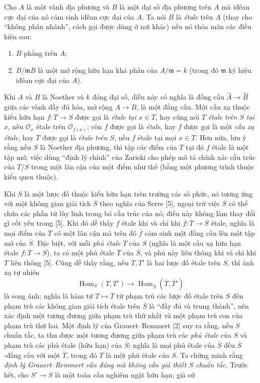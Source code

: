 Cho $A$ là một vành địa phương và $B$ là một đại số địa phương trên $A$ mà
iđêan cực đại của nó cảm sinh iđêan cực đại của $A$. Ta nói $B$ là
\emph{étale} trên $A$ (thay cho ``không phân nhánh'', cách gọi được dùng ở nơi
khác) nếu nó thỏa mãn các điều kiện sau:
\begin{enumerate}
\item[(i)] $B$ phẳng trên $A$;
\item[(ii)] $B/\mathfrak mB$ là một mở rộng hữu hạn khả phân của
$A/\mathfrak m=k$ (trong đó $\mathfrak m$ ký hiệu iđêan cực đại của $A$).
\end{enumerate}
Khi $A$ và $B$ là Noether và $k$ đóng đại số, điều này có nghĩa là đồng cấu
$\widehat A\longrightarrow\widehat B$ giữa các vành đầy đủ hóa, mở rộng
$A\longrightarrow B$, là một đẳng cấu. Một cấu xạ thuộc kiểu hữu hạn
$f:T\longrightarrow S$ được gọi là \emph{étale tại $x\in T$}, hay cũng nói
$T$ \emph{étale trên $S$ tại $x$}, nếu $\mathcal O_x$ étale trên
$\mathcal O_{f(x)}$; còn $f$ được gọi là \emph{étale}, hay $f$ được gọi là một
\emph{cấu xạ étale}, hay $T$ được gọi là \emph{étale trên $S$}, nếu $f$ étale tại mọi
$x\in T$. Hơn nữa, lưu ý rằng nếu $S$ là Noether địa phương, thì tập các điểm của
$T$ tại đó $f$ étale là một tập mở; việc dùng ``định lý chính'' của Zariski cho
phép mô tả chính xác cấu trúc của $T/S$ trong một lân cận của một điểm như thế
(bằng một phương trình thuộc kiểu quen thuộc).

Khi $S$ là một lược đồ thuộc kiểu hữu hạn trên trường các số phức, nó tương ứng
với một không gian giải tích $\overline S$ theo nghĩa của Serre [5], ngoại trừ
việc $\overline S$ có thể chứa các phần tử lũy linh trong bó cấu trúc của nó;
điều này không làm thay đổi gì cốt yếu trong [5]. Khi đó dễ thấy $f$ étale khi
và chỉ khi $\overline f:\overline T\longrightarrow\overline S$ étale, nghĩa là
mọi điểm của $\overline T$ có một lân cận mà trên đó $\overline f$ cảm sinh một
đẳng cấu lên một tập mở của $\overline S$. Đặc biệt, với mỗi \emph{phủ étale}
$T$ của $S$ (nghĩa là một cấu xạ hữu hạn étale $f:T\longrightarrow S$), ta có
một phủ étale $\overline T$ của $\overline S$, và phủ này liên thông khi và chỉ
khi $T$ liên thông [5]. Cũng dễ thấy rằng, nếu $T,T'$ là hai lược đồ
étale trên $S$, thì ánh xạ tự nhiên
\[
  \operatorname{Hom}_S(T,T')\longrightarrow
  \operatorname{Hom}_{\overline S}(\overline T,\overline{T'})
\]
là song ánh; nghĩa là hàm tử $T\longmapsto\overline T$ từ phạm trù các lược đồ
étale trên $S$ đến phạm trù các không gian giải tích étale trên $\overline S$
là ``đầy đủ và trung thành'', nên xác định một tương đương giữa phạm trù thứ
nhất và một phạm trù con của phạm trù thứ hai. Một định lý của
Grauert--Remmert [2] suy ra rằng, nếu $S$ chuẩn tắc, ta thu được một tương đương
giữa phạm trù các \emph{phủ étale} của $S$ và phạm trù các phủ étale (hữu hạn)
của $\overline S$; nghĩa là mọi phủ étale của $\overline S$ đều
$\overline S$-đẳng cấu với một $\overline T$, trong đó $T$ là một phủ étale của
$S$. Ta chứng minh rằng \emph{định lý Grauert--Remmert vẫn đúng mà không cần
giả thiết $S$ chuẩn tắc}. Trước hết, cho $S'\longrightarrow S$ là một toàn cấu
nghiêm ngặt hữu hạn; giả sử

